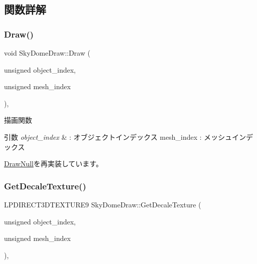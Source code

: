 \subsection{関数詳解}
\mbox{\label{class_sky_dome_draw_a42364ea42618cbab588d55050edfe95a}} 
\subsubsection{\texorpdfstring{Draw()}{Draw()}}
{\footnotesize\ttfamily void Sky\+Dome\+Draw\+::\+Draw (\begin{DoxyParamCaption}\item[{unsigned}]{object\+\_\+index,  }\item[{unsigned}]{mesh\+\_\+index }\end{DoxyParamCaption})\hspace{0.3cm}{\ttfamily [override]}, {\ttfamily [virtual]}}



描画関数 


\begin{DoxyParams}{引数}
{\em object\+\_\+index} & \+: オブジェクトインデックス mesh\+\_\+index \+: メッシュインデックス \\
\hline
\end{DoxyParams}


\mbox{\hyperlink{class_draw_null_afe50f6fd820b18d673f70f048743f339}{Draw\+Null}}を再実装しています。

\mbox{\label{class_sky_dome_draw_a1d708782f13648724e423d1dca22b213}} 
\subsubsection{\texorpdfstring{Get\+Decale\+Texture()}{GetDecaleTexture()}}
{\footnotesize\ttfamily L\+P\+D\+I\+R\+E\+C\+T3\+D\+T\+E\+X\+T\+U\+R\+E9 Sky\+Dome\+Draw\+::\+Get\+Decale\+Texture (\begin{DoxyParamCaption}\item[{unsigned}]{object\+\_\+index,  }\item[{unsigned}]{mesh\+\_\+index }\end{DoxyParamCaption})\hspace{0.3cm}{\ttfamily [override]}, {\ttfamily [virtual]}}




